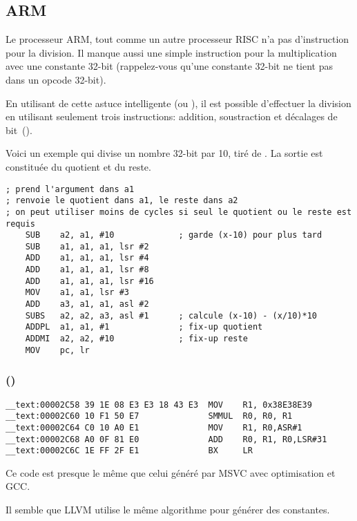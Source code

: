﻿\subsection{ARM}

Le processeur ARM, tout comme un autre processeur  RISC n'a pas d'instruction
pour la division.
Il manque aussi une simple instruction pour la multiplication avec une constante 32-bit
(rappelez-vous qu'une constante 32-bit ne tient pas dans un opcode 32-bit).

En utilisant de cette astuce intelligente (ou ), il est possible d'effectuer
la division en utilisant seulement trois instructions: addition, soustraction et
décalages de bit~().

Voici un exemple qui divise un nombre 32-bit par 10, tiré de
.
La sortie est constituée du quotient et du reste.

\begin{lstlisting}[style=customasmARM]
; prend l'argument dans a1
; renvoie le quotient dans a1, le reste dans a2
; on peut utiliser moins de cycles si seul le quotient ou le reste est requis
    SUB    a2, a1, #10             ; garde (x-10) pour plus tard
    SUB    a1, a1, a1, lsr #2
    ADD    a1, a1, a1, lsr #4
    ADD    a1, a1, a1, lsr #8
    ADD    a1, a1, a1, lsr #16
    MOV    a1, a1, lsr #3
    ADD    a3, a1, a1, asl #2
    SUBS   a2, a2, a3, asl #1      ; calcule (x-10) - (x/10)*10
    ADDPL  a1, a1, #1              ; fix-up quotient
    ADDMI  a2, a2, #10             ; fix-up reste
    MOV    pc, lr
\end{lstlisting}

\subsubsection{\OptimizingXcodeIV (\ARMMode)}

\begin{lstlisting}[style=customasmARM]
__text:00002C58 39 1E 08 E3 E3 18 43 E3  MOV    R1, 0x38E38E39
__text:00002C60 10 F1 50 E7              SMMUL  R0, R0, R1
__text:00002C64 C0 10 A0 E1              MOV    R1, R0,ASR#1
__text:00002C68 A0 0F 81 E0              ADD    R0, R1, R0,LSR#31
__text:00002C6C 1E FF 2F E1              BX     LR
\end{lstlisting}

Ce code est presque le même que celui généré par MSVC avec optimisation et GCC.

Il semble que LLVM utilise le même algorithme pour générer des constantes.

